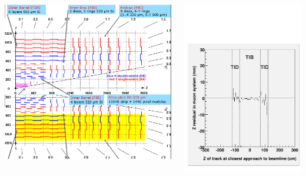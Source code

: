 \documentclass[compress]{beamer}
\begin{document}
\begin{frame}
\begin{columns}
\includegraphics[width=\linewidth]{tracker_map_outerbottom.png}

\includegraphics[width=\linewidth]{zresid_from_tracker_innerbottom.pdf}


\end{columns}
\end{frame}
\end{document}
